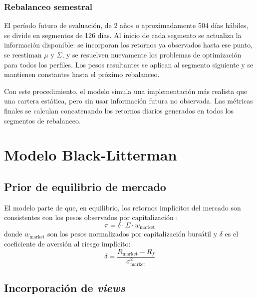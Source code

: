 \subsubsection{Rebalanceo semestral}

El per\'iodo futuro de evaluaci\'on, de 2 a\~nos o aproximadamente 504 d\'ias h\'abiles, se divide en segmentos de 126 d\'ias. Al inicio de cada segmento se actualiza la informaci\'on disponible: se incorporan los retornos ya observados hasta ese punto, se reestiman $\mu$ y $\Sigma$, y se resuelven nuevamente los problemas de optimizaci\'on para todos los perfiles. Los pesos resultantes se aplican al segmento siguiente y se mantienen constantes hasta el pr\'oximo rebalanceo.

Con este procedimiento, el modelo simula una implementaci\'on m\'as realista que una cartera est\'atica, pero sin usar informaci\'on futura no observada. Las m\'etricas finales se calculan concatenando los retornos diarios generados en todos los segmentos de rebalanceo.


\section{Modelo Black-Litterman}

\subsection{Prior de equilibrio de mercado}

El modelo parte de que, en equilibrio, los retornos impl\'icitos del mercado
son consistentes con los pesos observados por capitalizaci\'on
\cite{black1992, he1999}:
\begin{equation}
\pi = \delta \cdot \Sigma \cdot w_{\text{market}}
\end{equation}
donde $w_{\text{market}}$ son los pesos normalizados por capitalizaci\'on
burs\'atil y $\delta$ es el coeficiente de aversi\'on al riesgo impl\'icito:
\begin{equation}
\delta = \frac{R_{\text{market}} - R_f}{\sigma_{\text{market}}^2}
\end{equation}

\subsection{Incorporaci\'on de \textit{views}}

